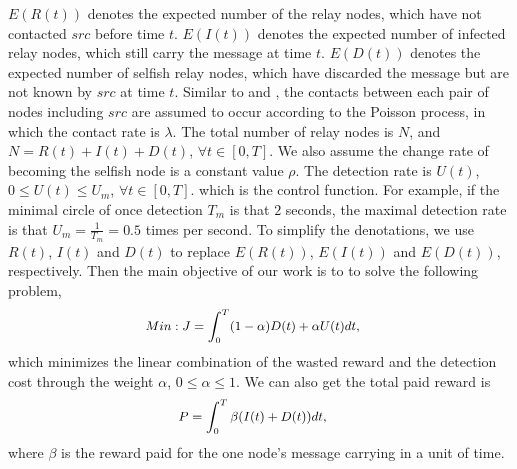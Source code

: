 $E(R(t))$ denotes the expected number of the relay nodes,
which have not contacted $src$ before time $t$.
$E(I(t))$ denotes the expected number of infected relay nodes,
which still carry the message at time $t$.
$E(D(t))$ denotes the expected number of selfish relay nodes,
which have discarded the message but are not known by $src$
at time $t$.
Similar to \cite{DBLP:journals/tcss/WuDH18} and \cite{CC2007PerfAnaly},
the contacts between each pair of nodes including $src$
are assumed to occur according to the Poisson process,
in which the contact rate is $\lambda$.
The total number of relay nodes is $N$,
and $N=R(t)+I(t)+D(t)$, $\forall t \in [0, T]$.
We also assume the change rate of
becoming the selfish node is a constant value $\rho$.
The detection rate is $U(t)$,
$0 \le U(t) \le U_{m}$, $\forall t \in [0, T]$.
which is the control function.
For example, if the minimal circle
of once detection $T_{m}$ is that $2$ seconds,
the maximal detection rate is
that $U_{m} = \frac{1}{T_{m}} = 0.5$ times per second.
To simplify the denotations,
we use $R(t)$, $I(t)$ and $D(t)$ to
replace $E(R(t))$, $E(I(t))$ and $E(D(t))$,
respectively.
Then the main objective of our work is to
to solve the following problem,
\begin{equation}
\begin{small}
\label{eq:obj}
\begin{aligned}
Min: J &= \int_{0}^{T} (1-\alpha) D(t) + \alpha U(t) dt,
\end{aligned}
\end{small}
\end{equation}
which minimizes the linear combination of
the wasted reward and the detection cost through the weight $\alpha$, $0 \le \alpha \le 1$.
We can also get the total paid reward is
\begin{equation}
\begin{small}
\label{eq:reward}
\begin{aligned}
P &= \int_{0}^{T} \beta ( I(t) + D(t) )dt,
\end{aligned}
\end{small}
\end{equation}
where $\beta$ is the reward paid for the one node's message carrying in a unit of time.

